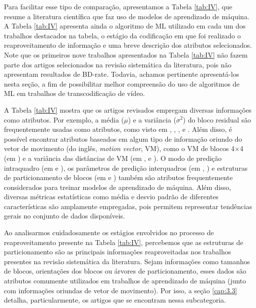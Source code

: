 Para facilitar esse tipo de comparação, apresentamos a Tabela \ref{tab:IV}, que resume a literatura científica que faz uso de modelos de aprendizado de máquina. A Tabela \ref{tab:IV} apresenta ainda o algoritmo de ML utilizado em cada um dos trabalhos destacados na tabela, o estágio da codificação em que foi realizado o reaproveitamento de informação e uma breve descrição dos atributos selecionados. Note que os primeiros nove trabalhos apresentados na Tabela \ref{tab:IV} não fazem parte dos artigos selecionados na revisão sistemática da literatura, pois não apresentam resultados de BD-rate. Todavia, achamos pertinente apresentá-los nesta seção, a fim de possibilitar melhor compreensão do uso de algoritmos de ML em trabalhos de transcodificação de vídeo.



A Tabela \ref{tab:IV} mostra que os artigos revisados empregam diversas informações como atributos. Por exemplo, a média ($\mu$) e a variância ($\sigma^2$) do bloco residual são frequentemente usadas como atributos, como visto em \citet{bib:fernandez2_2006}, \citet{bib:holder_2009}, \citet{bib:huangyuan_2015}, e \citet{bib:honrubia_2015}. Além disso, é possível encontrar atributos baseados em algum tipo de informação oriundo do vetor de movimento (do inglês, \textit{motion vector}, VM), como o VM de blocos 4$\times$4 (em \citet{bib:escribano3_2008}) e a variância das distâncias de VM (em \citet{bib:peixoto2_2014}, \citet{bib:honrubia_2014} e \citet{bib:li_2017}). O modo de predição intraquadro (em \citet{bib:honrubia_2016} e \citet{bib:soares_2019}), os parâmetros de predição interquadros (em \citet{bib:correa_2016}, \citet{bib:honrubia_2015}) e estruturas de particionamento de blocos (em \citet{bib:grellert_2018} e \citet{bib:xu_2019}) também são atributos frequentemente considerados para treinar modelos de aprendizado de máquina. Além disso, diversas métricas estatísticas como média e desvio padrão de diferentes características são amplamente empregadas, pois permitem representar tendências gerais no conjunto de dados disponíveis.

Ao analisarmos cuidadosamente os estágios envolvidos no processo de reaproveitamento presente na Tabela \ref{tab:IV}, percebemos que as estruturas de particionamento são as principais informações reaproveitadas nos trabalhos presentes na revisão sistemática da literatura. Sejam informações como tamanhos de blocos, orientações dos blocos ou árvores de particionamento, esses dados são atributos comumente utilizados em trabalhos de aprendizado de máquina (junto com informações oriundas de vetor de movimento). Por isso, a seção \ref{cap:3.3} detalha, particularmente, os artigos que se encontram nessa subcategoria.
